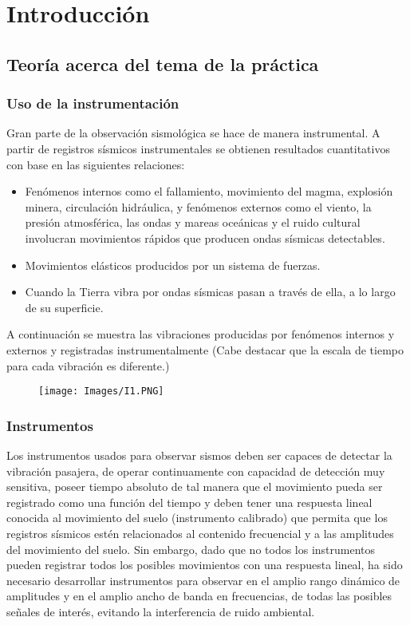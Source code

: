 \documentclass[12pt]{article}
\begin{document}
	\tableofcontents
	\newpage
	\section{Introducción}
	    \subsection{Teoría acerca del tema de la práctica}
	        \subsubsection{Uso de la instrumentación}
	         Gran parte de la observación sismológica se hace de manera instrumental. A partir de registros sísmicos instrumentales se obtienen resultados cuantitativos con base en las siguientes relaciones:
	       \begin{itemize}
	           \item Fenómenos internos como el fallamiento, movimiento del magma, explosión minera, circulación hidráulica, y fenómenos externos como el viento, la presión atmosférica, las ondas y mareas oceánicas y el ruido cultural involucran movimientos rápidos que producen ondas sísmicas detectables.
	           \item Movimientos elásticos producidos por un sistema de fuerzas.
	           \item Cuando la Tierra vibra por ondas sísmicas pasan a través de ella, a lo largo de su superficie.
	       \end{itemize}
	       A continuación se muestra las vibraciones producidas por fenómenos internos y externos y registradas instrumentalmente (Cabe destacar que la escala de tiempo para cada vibración es diferente.) 
	       \begin{figure}[H]
    	       \centering
    	        \texttt{[image: Images/I1.PNG]}
    	   \end{figure}
    	    
    	    \subsubsection{Instrumentos}
    	    Los instrumentos usados para observar sismos deben ser capaces de detectar la vibración pasajera, de operar continuamente con capacidad de detección muy sensitiva, poseer tiempo absoluto de tal manera que el movimiento pueda ser registrado como una función del tiempo y deben tener una respuesta lineal conocida al movimiento del suelo (instrumento calibrado) que permita que los registros sísmicos estén relacionados al contenido frecuencial y a las amplitudes del movimiento del suelo. Sin embargo, dado que no todos los instrumentos pueden registrar todos los posibles movimientos con una respuesta lineal, ha sido necesario desarrollar instrumentos para observar en el amplio rango dinámico de amplitudes y en el amplio ancho de banda en frecuencias, de todas las posibles señales de interés, evitando la interferencia de ruido ambiental.
    	    
\end{document}
